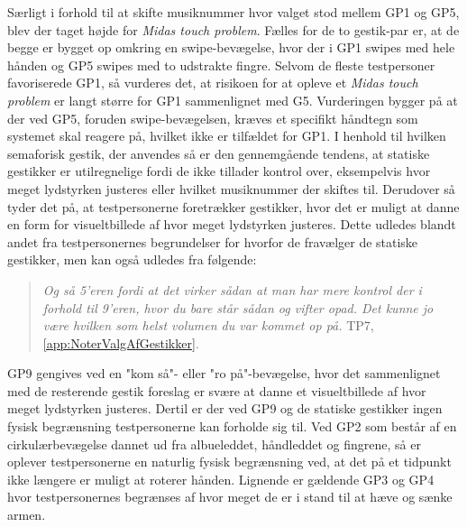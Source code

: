 Særligt i forhold til at skifte musiknummer hvor valget stod mellem GP1 og GP5, blev der taget højde for \textit{Midas touch problem}. Fælles for de to gestik-par er, at de begge er bygget op omkring en swipe-bevægelse, hvor der i GP1 swipes med hele hånden og GP5 swipes med to udstrakte fingre. Selvom de fleste testpersoner favoriserede GP1, så vurderes det, at risikoen for at opleve et \textit{Midas touch problem} er langt større for GP1 sammenlignet med G5. Vurderingen bygger på at der ved GP5, foruden swipe-bevægelsen, kræves et specifikt håndtegn som systemet skal reagere på, hvilket ikke er tilfældet for GP1.\blankline
%
I henhold til hvilken semaforisk gestik, der anvendes så er den gennemgående tendens, at statiske gestikker er utilregnelige fordi de ikke tillader kontrol over, eksempelvis hvor meget lydstyrken justeres eller hvilket musiknummer der skiftes til. Derudover så tyder det på, at testpersonerne foretrækker gestikker, hvor det er muligt at danne en form for visueltbillede af hvor meget lydstyrken justeres. Dette udledes blandt andet fra testpersonernes begrundelser for hvorfor de fravælger de statiske gestikker, men kan også udledes fra følgende:  
%
\begin{quotation}
	\noindent
	\textit{Og så 5'eren fordi at det virker sådan at man har mere kontrol der i forhold til 9'eren, hvor du bare står sådan og vifter opad. Det kunne jo være hvilken som helst volumen du var kommet op på.} TP7, \autoref{app:NoterValgAfGestikker}.
\noindent
\end{quotation}
%
GP9 gengives ved en "kom så"- eller "ro på"-bevægelse, hvor det sammenlignet med de resterende gestik foreslag er svære at danne et visueltbillede af hvor meget lydstyrken justeres. Dertil er der ved GP9 og de statiske gestikker ingen fysisk begrænsning testpersonerne kan forholde sig til. Ved GP2 som består af en cirkulærbevægelse dannet ud fra albueleddet, håndleddet og fingrene, så er oplever testpersonerne en naturlig fysisk begrænsning ved, at det på et tidpunkt ikke længere er muligt at roterer hånden. Lignende er gældende GP3 og GP4 hvor testpersonernes begrænses af hvor meget de er i stand til at hæve og sænke armen.

